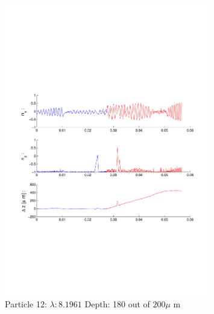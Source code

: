 \begin{figure}[H]

\includegraphics[width=0.8\textwidth]{Images/Particle 12/Particle12.pdf}

\caption{Particle 12:  $ \lambda: 8.1961$ Depth: 180 out of $200 \mu $ m}

\centering

\end{figure}

